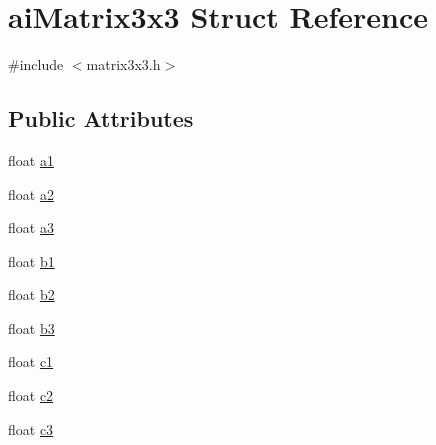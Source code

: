 \hypertarget{structai_matrix3x3}{\section{ai\-Matrix3x3 Struct Reference}
\label{structai_matrix3x3}
}


{\ttfamily \#include $<$matrix3x3.\-h$>$}

\subsection*{Public Attributes}
\begin{DoxyCompactItemize}
\item 
float \hyperlink{structai_matrix3x3_a6884258a2f50758ed8b554b531186917}{a1}
\item 
float \hyperlink{structai_matrix3x3_a4c74733870193040ba4953fb673e77df}{a2}
\item 
float \hyperlink{structai_matrix3x3_a851d391df32a39e1ced1a9a286b38cf4}{a3}
\item 
float \hyperlink{structai_matrix3x3_a9eeba340d3502017caad70416f03863a}{b1}
\item 
float \hyperlink{structai_matrix3x3_a9f5e25b60bbd7bdf8f0a19cd82cc6b15}{b2}
\item 
float \hyperlink{structai_matrix3x3_a21aa4345fe6ce2774db94d118c536d02}{b3}
\item 
float \hyperlink{structai_matrix3x3_ae62a2877076cbee151e89cb34567e3ca}{c1}
\item 
float \hyperlink{structai_matrix3x3_a8e0d85d5c46eb4f4478f1fe159be4320}{c2}
\item 
float \hyperlink{structai_matrix3x3_aa7eef894dec22db1011092410b24f19b}{c3}
\end{DoxyCompactItemize}


